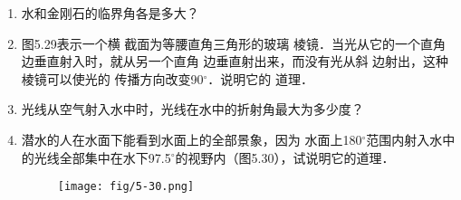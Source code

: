 \begin{enumerate}
    \item 水和金刚石的临界角各是多大？

    \begin{solution}

    \end{solution}
    \item 图5.29表示一个横
截面为等腰直角三角形的玻璃
棱镜．当光从它的一个直角边垂直射入时，就从另一个直角
边垂直射出来，而没有光从斜
边射出，这种棱镜可以使光的
传播方向改变90$^\circ$．说明它的
道理．
\begin{figure}[htp]
	\centering
{}
	\caption{}
\end{figure}


\begin{solution}

\end{solution}
\item 光线从空气射入水中时，光线在水中的折射角最大为多少度？

\begin{solution}

\end{solution}
\item 潜水的人在水面下能看到水面上的全部景象，因为
水面上180$^\circ$范围内射入水中的光线全部集中在水下97.5$^\circ$的视野内（图5.30），试说明它的道理．
\begin{figure}[htp]\centering
    \texttt{[image: fig/5-30.png]}
    \caption{}
    \end{figure}

    \begin{solution}

    \end{solution}
\end{enumerate}



